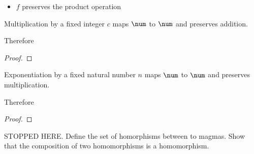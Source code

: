 \documentclass{amsart}
\begin{document}
\begin{itemize}
	\item $f$ preserves the product operation
\end{itemize}

\begin{example}
Multiplication by a fixed integer $c$ maps $\num$ to $\num$ and preserves addition.


Therefore

\begin{proof}
\end{proof}

\end{example}

\begin{example}
Exponentiation by a fixed natural number $n$ maps $\num$ to $\num$ and preserves multiplication.


Therefore

\begin{proof}
\end{proof}

\end{example}

STOPPED HERE. Define the set of homorphisms between to magmas.
Show that the composition of two homomorphisms is a homomorphism.
\end{document}
